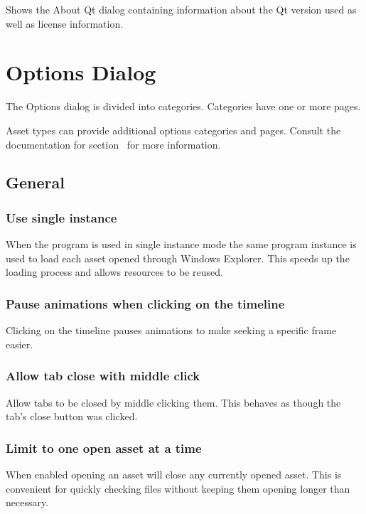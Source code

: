 \documentclass[10pt, a4paper, titlepage, oneside]{article}
\begin{document}
Shows the About Qt dialog containing information about the Qt version used as well as license information.

\newpage

\section{Options Dialog}

The Options dialog is divided into categories. Categories have one or more pages.

Asset types can provide additional options categories and pages. Consult the documentation for section~ for more information.

\subsection{General}

\subsubsection{Use single instance}

When the program is used in single instance mode the same program instance is used to load each asset opened through Windows Explorer. This speeds up the loading process and allows resources to be reused.

\subsubsection{Pause animations when clicking on the timeline}

Clicking on the timeline pauses animations to make seeking a specific frame easier.

\subsubsection{Allow tab close with middle click}

Allow tabs to be closed by middle clicking them. This behaves as though the tab's close button was clicked.

\subsubsection{Limit to one open asset at a time}

When enabled opening an asset will close any currently opened asset. This is convenient for quickly checking files without keeping them opening longer than necessary.
\end{document}
